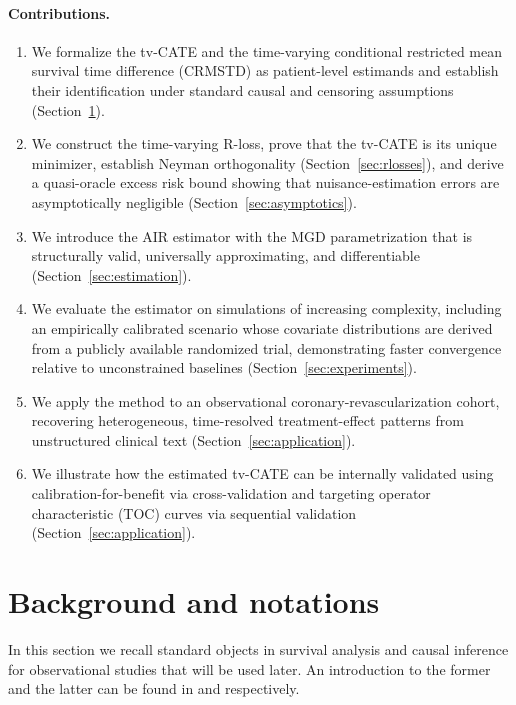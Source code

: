 \documentclass{article}
\begin{document}
\paragraph{Contributions.}
\begin{enumerate}
  \item We formalize the tv-CATE and the time-varying conditional restricted mean survival time difference (CRMSTD) as patient-level estimands and establish their identification under standard causal and censoring assumptions (Section~\ref{sec:notations}).
  \item We construct the time-varying R-loss, prove that the tv-CATE is its unique minimizer, establish Neyman orthogonality (Section~\ref{sec:rlosses}), and derive a quasi-oracle excess risk bound showing that nuisance-estimation errors are asymptotically negligible (Section~\ref{sec:asymptotics}).
  \item We introduce the AIR estimator with the MGD parametrization that is structurally valid, universally approximating, and differentiable (Section~\ref{sec:estimation}).
  \item We evaluate the estimator on simulations of increasing complexity, including an empirically calibrated scenario whose covariate distributions are derived from a publicly available randomized trial, demonstrating faster convergence relative to unconstrained baselines (Section~\ref{sec:experiments}).
  \item We apply the method to an observational coronary-revascularization cohort, recovering heterogeneous, time-resolved treatment-effect patterns from unstructured clinical text (Section~\ref{sec:application}).
  \item We illustrate how the estimated tv-CATE can be internally validated using calibration-for-benefit via cross-validation and targeting operator characteristic (TOC) curves via sequential validation (Section~\ref{sec:application}).
\end{enumerate}

\section{Background and notations}\label{sec:notations}

In this section we recall standard objects in survival analysis and causal inference for observational studies that will be used later. An introduction to the former and the latter can be found in \citet{klein2003survival} and \citet{imbens2015causal} respectively. 
\end{document}
